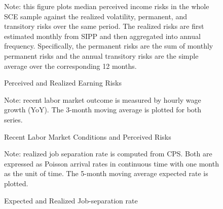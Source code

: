     
    \clearpage
    \begin{figure}[!ht]
    	\caption{Perceived and Realized Earning Risks}
    	\label{fig:ts_compare}
    	\begin{center}
    		\vbiskip
    	\vbiskip
    	\end{center}
    \begin{flushleft}Note: this figure plots median perceived income risks in the whole SCE sample against the realized volatility, permanent, and transitory risks over the same period. The realized risks are first estimated monthly from SIPP and then aggregated into annual frequency. Specifically, the permanent risks are the sum of monthly permanent risks and the annual transitory risks are the simple average over the corresponding 12 months.\end{flushleft}
    \end{figure}
    
  
    \clearpage
    \begin{figure}[!ht]
      \caption{Recent Labor Market Conditions and Perceived Risks}
    \label{fig:ts_he}
    	\begin{center}
    \end{center}
    \begin{flushleft}Note: recent labor market outcome is measured by hourly wage growth (YoY). The 3-month moving average is plotted for both series.\end{flushleft}
    \end{figure}
    
     
    \clearpage
    \begin{figure}[!ht]
      \caption{Expected and Realized Job-separation rate}
    \label{fig:srate_compare}
    	\begin{center}\end{center}
    \begin{flushleft}Note: realized job separation rate is computed from CPS. Both are expressed as Poisson arrival rates in continuous time with one month as the unit of time. The 5-month moving average expected rate is plotted.\end{flushleft}
    \end{figure}
    
